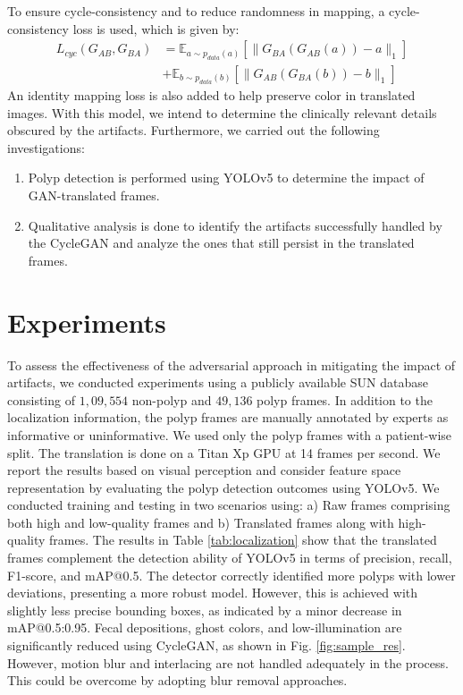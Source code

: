 \documentclass[letterpaper]{article} %
\begin{document}
To ensure cycle-consistency and to reduce randomness in mapping, a cycle-consistency loss is used, which is given by:  
\begin{equation} 
   \begin{split}
    L_{cyc}(G_{AB}, G_{BA}) & = \mathbb{E}_{a\sim p_{data}(a)}[\lVert G_{BA}(G_{AB}(a))-a\rVert_1] \\ & + \mathbb{E}_{b\sim p_{data}(b)}[\lVert G_{AB}(G_{BA}(b))-b\rVert_1]
  \end{split}
\end{equation}
An identity mapping loss is also added to help preserve color in translated images. 
With this model, we intend to determine the clinically relevant details obscured by the artifacts. Furthermore, we carried out the following investigations:
\begin{enumerate}
    \item Polyp detection is performed using YOLOv5 \cite{yolov5} to determine the impact of GAN-translated frames.
    \item Qualitative analysis is done to identify the artifacts successfully handled by the CycleGAN and analyze the ones that still persist in the translated frames.
\end{enumerate}




\section{Experiments}
To assess the effectiveness of the adversarial approach in mitigating the impact of artifacts, we conducted experiments using a publicly available SUN database \cite{misawa2021development} consisting of $1,09,554$ non-polyp and $49,136$ polyp frames. In addition to the localization information, the polyp frames are manually annotated by experts as informative or uninformative. We used only the polyp frames with a patient-wise split. 
The translation is done on a Titan Xp GPU at 14 frames per second.
We report the results based on visual perception and consider feature space representation by evaluating the polyp detection outcomes using YOLOv5. We conducted training and testing in two scenarios using: a) Raw frames comprising both high and low-quality frames and b) Translated frames along with high-quality frames. The results in Table \ref{tab:localization} show that the translated frames complement the detection ability of YOLOv5 in terms of precision, recall, F1-score, and mAP@0.5. The detector correctly identified more polyps with lower deviations, presenting a more robust model. However, this is achieved with slightly less precise bounding boxes, as indicated by a minor decrease in mAP@0.5:0.95. Fecal depositions, ghost colors, and low-illumination are significantly reduced using CycleGAN, as shown in Fig. \ref{fig:sample_res}. However, motion blur and interlacing are not handled adequately in the process. This could be overcome by adopting blur removal approaches. 
\end{document}
